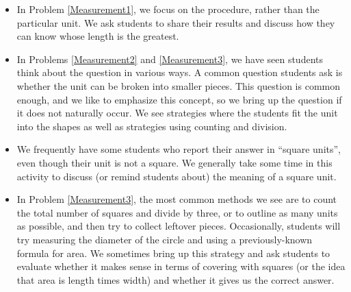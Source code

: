 \documentclass[nooutcomes]{ximera}
\begin{document}
\begin{instructorNotes}
\begin{itemize}
    \item In Problem \ref{Measurement1}, we focus on the procedure, rather than the particular unit.  We ask students to share their results and discuss how they can know whose length is the greatest.
    \item In Problems \ref{Measurement2} and \ref{Measurement3}, we have seen students think about the question in various ways.  A common question students ask is whether the unit can be broken into smaller pieces.  This question is common enough, and we like to emphasize this concept, so we bring up the question if it does not naturally occur.  We see strategies where the students fit the unit into the shapes as well as strategies using counting and division.
    \item We frequently have some students who report their answer in ``square units'', even though their unit is not a square.  We generally take some time in this activity to discuss (or remind students about) the meaning of a square unit. 
    \item In Problem \ref{Measurement3}, the most common methods we see are to count the total number of squares and divide by three, or to outline as many units as possible, and then try to collect leftover pieces.  Occasionally, students will try  measuring the diameter of the circle and using a previously-known formula for area.  We sometimes bring up this strategy and ask students to evaluate whether it makes sense in terms of covering with squares (or the idea that area is length times width) and whether it gives us the correct answer.
\end{itemize}





\end{instructorNotes}
\end{document}

